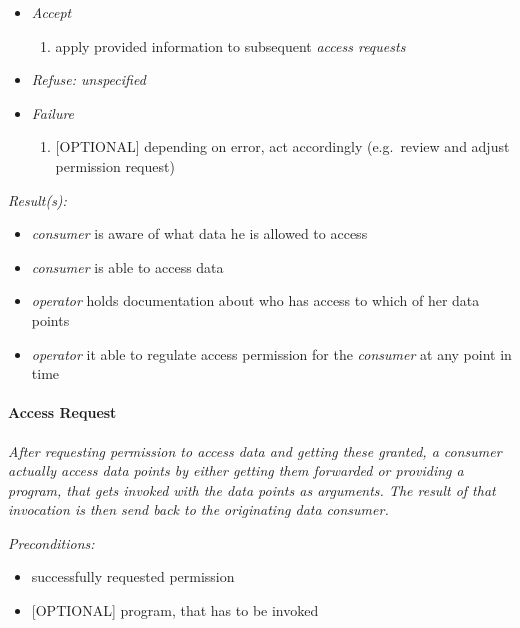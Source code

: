 \documentclass[12pt,english,a4paper,titlepage,cleardoublepage=empty,dottedtoc]{report}
\providecommand{\tightlist}{%
  \setlength{\itemsep}{0pt}\setlength{\parskip}{0pt}}
\begin{document}
\begin{enumerate}
  \begin{itemize}
  \item
    \emph{Accept}

    \begin{enumerate}
    \def\labelenumii{\arabic{enumii})}
    \tightlist
    \item
      apply provided information to subsequent \emph{access requests}
    \end{enumerate}
  \item
    \emph{Refuse: unspecified}
  \item
    \emph{Failure}

    \begin{enumerate}
    \def\labelenumii{\arabic{enumii})}
    \tightlist
    \item
      {[}OPTIONAL{]} depending on error, act accordingly (e.g.~review
      and adjust permission request)
    \end{enumerate}
  \end{itemize}
\end{enumerate}

\emph{Result(s):}

\begin{itemize}
\tightlist
\item
  \emph{consumer} is aware of what data he is allowed to access
\item
  \emph{consumer} is able to access data
\item
  \emph{operator} holds documentation about who has access to which of
  her data points
\item
  \emph{operator} it able to regulate access permission for the
  \emph{consumer} at any point in time
\end{itemize}

\paragraph{Access Request}\label{access-request}

\emph{After requesting permission to access data and getting these
granted, a consumer actually access data points by either getting them
forwarded or providing a program, that gets invoked with the data points
as arguments. The result of that invocation is then send back to the
originating data consumer.}

\emph{Preconditions:}

\begin{itemize}
\tightlist
\item
  successfully requested permission
\item
  {[}OPTIONAL{]} program, that has to be invoked
\end{itemize}
\end{document}
